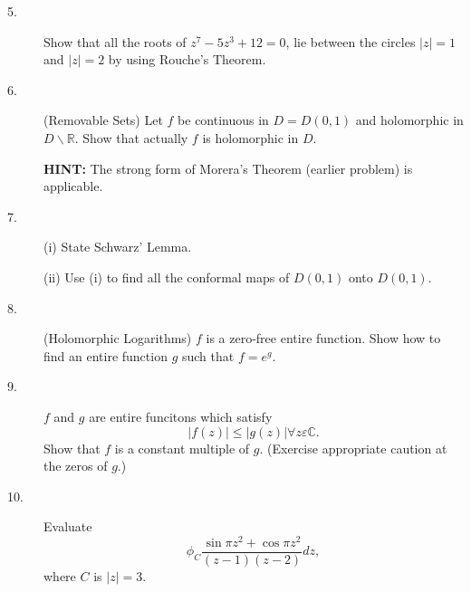 \documentclass{article}
\def\R{\mathbb R}
\def\C{\mathbb C}
\begin{document}
\begin{description}
\item[5.]
Show that all the roots of $z^7 - 5z^3 + 12 = 0$, lie between the circles
$|z| = 1$ and $|z| = 2$ by using Rouche's Theorem.

\item[6.]
(Removable Sets) Let $f$ be continuous in $D= D(0,1)$ and holomorphic in
$D \backslash \R$. Show that actually $f$ is holomorphic in $D$.

{\bf HINT:} The strong form of Morera's Theorem (earlier problem) is
applicable.

\item[7.] (i)
State Schwarz' Lemma.

\item[\quad] (ii)
Use (i) to find all the conformal maps of $D(0,1)$ onto $D(0,1)$.

\item[8.]
(Holomorphic Logarithms) $f$ is a zero-free entire function. Show how to
find an entire function $g$ such that $f = e^g$.

\item[9.]
$f$ and $g$ are entire funcitons which satisfy
$$|f(z)| \leq |g(z)| \forall z \varepsilon \C.$$
Show that $f$ is a constant multiple of $g$. (Exercise appropriate caution
at the zeros of $g$.)

\item[10.]
Evaluate
$$\phi_C \frac{\sin \pi z^2 + \cos \pi z^2}{(z-1)(z-2)} dz,$$
where $C$ is $|z| = 3$.





\end{description}    
\end{document}
